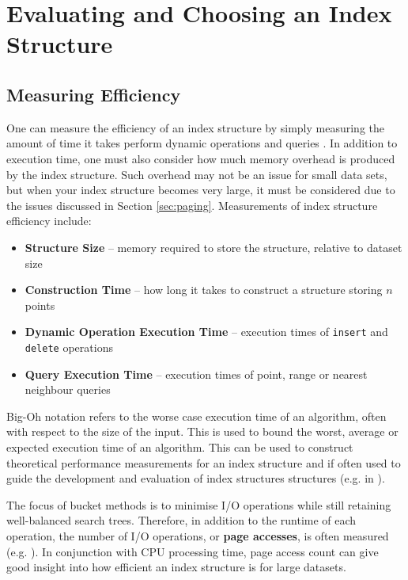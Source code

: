 \section{Evaluating and Choosing an Index Structure}
\label{sec:comparison}

\subsection{Measuring Efficiency}
\label{sec:measuring-efficiency}

One can measure the efficiency of an index structure by simply measuring the amount of time it takes perform dynamic operations and queries \cite{dynamic-data-structures}. In addition to execution time, one must also consider how much memory overhead is produced by the index structure. Such overhead may not be an issue for small data sets, but when your index structure becomes very large, it must be considered due to the issues discussed in Section \ref{sec:paging}. Measurements of index structure efficiency include:
\begin{itemize}
	\item \textbf{Structure Size} -- memory required to store the structure, relative to dataset size
	\item \textbf{Construction Time} -- how long it takes to construct a structure storing $n$ points
	\item \textbf{Dynamic Operation Execution Time} -- execution times of \texttt{insert} and \texttt{delete} operations
	\item \textbf{Query Execution Time} -- execution times of point, range or nearest neighbour queries
\end{itemize}
Big-Oh notation \cite{design-analysis-algorithms} refers to the worse case execution time of an algorithm, often with respect to the size of the input. This is used to bound the worst, average or expected execution time of an algorithm. This can be used to construct theoretical performance measurements for an index structure and if often used to guide the development and evaluation of index structures structures (e.g. in  \cite{splay-quadtree}).

The focus of bucket methods is to minimise I/O operations while still retaining well-balanced search trees. Therefore, in addition to the runtime of each operation, the number of I/O operations, or \textbf{page accesses}, is often measured (e.g. \cite{pk-tree, pyramid-tree, x-tree}). In conjunction with CPU processing time, page access count can give good insight into how efficient an index structure is for large datasets.

